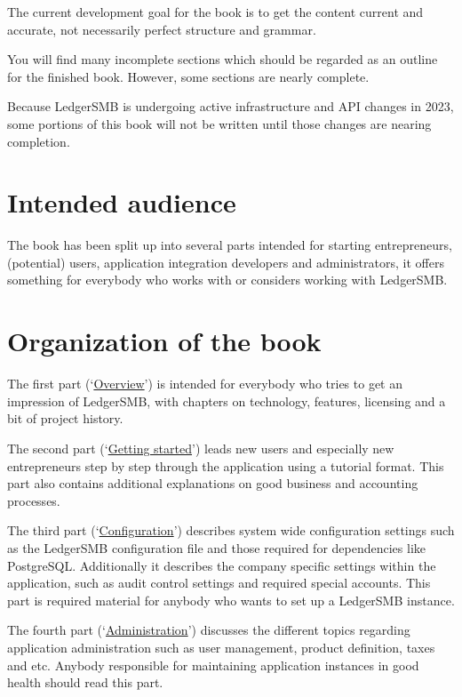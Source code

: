 \documentclass[10pt,a4paper]{book}
\begin{document}
The current development goal for the book is to get the content current and accurate,
not necessarily perfect structure and grammar.

You will find many incomplete sections which should be regarded as an outline for the finished book.
However, some sections are nearly complete.

Because LedgerSMB is undergoing active infrastructure and API changes in 2023, some portions of this book will not be written until those changes are nearing completion.

\section*{Intended audience}
\label{sec-intended-audience}

The book has been split up into several parts intended for starting entrepreneurs,
(potential) users, application integration developers and
administrators, it offers something for everybody who works with or considers working with
LedgerSMB.

\section*{Organization of the book}
\label{sec-book-organization}

The first
part (\lq\hyperref[part-overview]{Overview}\rq) is intended for everybody who tries to get an impression of LedgerSMB, with
chapters on technology, features, licensing and a bit of project history.

The second part
(\lq\hyperref[part-getting-started]{Getting started}\rq) leads new users and especially new entrepreneurs step by step through the
application using a tutorial format. This part also contains additional explanations on good business and accounting
processes.

The third part (\lq\hyperref[part-configuration]{Configuration}\rq) describes system wide configuration settings such as
the LedgerSMB configuration file and those required for dependencies like PostgreSQL. Additionally
it describes the company specific settings within the application, such as audit control settings
and required special accounts. This part is required material for anybody who wants to set up
a LedgerSMB instance.

The fourth part (\lq\hyperref[part-administration]{Administration}\rq) discusses the different topics
regarding application administration such as user management, product definition, taxes and etc.
Anybody responsible for maintaining application instances in good health should read this part.
\end{document}
